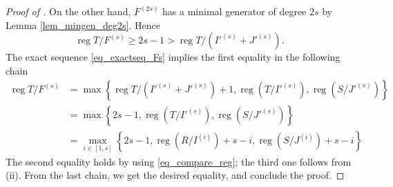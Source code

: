 \documentclass{amsart}
\DeclareMathOperator{\reg}{reg}
\theoremstyle{plain}
\theoremstyle{definition}
\numberwithin{equation}{section}
\begin{document}
\begin{proof}[Proof of ]
On the other hand, $F^{(2s)}$ has a minimal generator of degree $2s$ by Lemma \ref{lem_mingen_deg2s}. Hence
\begin{equation}
\label{eq_compare_reg}
\reg T/F^{(s)} \ge 2s-1 > \reg T/(I'^{(s)}+J'^{(s)}).
\end{equation}
The exact sequence \eqref{eq_exactseq_Fs} implies the first equality in the following chain
\begin{align*}
\reg T/F^{(s)} &= \max \left\{\reg T/(I'^{(s)}+J'^{(s)})+1, \reg (T/I'^{(s)}), \reg (S/J'^{(s)}) \right\}\\
               &= \max \left \{2s-1, \reg (T/I'^{(s)}), \reg (S/J'^{(s)}) \right \}\\
               &= \max\limits_{i\in [1,s]} \left \{2s-1, \reg (R/I^{(i)})+s-i, \reg (S/J^{(i)})+s-i \right \}
\end{align*}
The second equality holds by using \eqref{eq_compare_reg}; the third one follows from (ii). From the last chain, we get the desired equality, and conclude the proof.
\end{proof}
\end{document}
